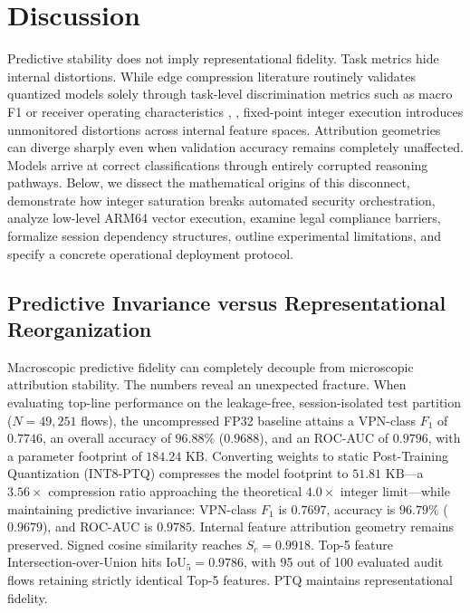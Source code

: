 \documentclass[conference]{IEEEtran}
\begin{document}
\section{Discussion}
Predictive stability does not imply representational fidelity. Task metrics hide internal distortions. While edge compression literature routinely validates quantized models solely through task-level discrimination metrics such as macro F1 or receiver operating characteristics \cite{b6}, \cite{b18}, fixed-point integer execution introduces unmonitored distortions across internal feature spaces. Attribution geometries can diverge sharply even when validation accuracy remains completely unaffected. Models arrive at correct classifications through entirely corrupted reasoning pathways. Below, we dissect the mathematical origins of this disconnect, demonstrate how integer saturation breaks automated security orchestration, analyze low-level ARM64 vector execution, examine legal compliance barriers, formalize session dependency structures, outline experimental limitations, and specify a concrete operational deployment protocol.

\subsection{Predictive Invariance versus Representational Reorganization}
Macroscopic predictive fidelity can completely decouple from microscopic attribution stability. The numbers reveal an unexpected fracture. When evaluating top-line performance on the leakage-free, session-isolated test partition ($N = 49,251$ flows), the uncompressed FP32 baseline attains a VPN-class $F_1$ of $0.7746$, an overall accuracy of $96.88\%$ ($0.9688$), and an ROC-AUC of $0.9796$, with a parameter footprint of $184.24\text{ KB}$. Converting weights to static Post-Training Quantization (INT8-PTQ) compresses the model footprint to $51.81\text{ KB}$—a $3.56\times$ compression ratio approaching the theoretical $4.0\times$ integer limit—while maintaining predictive invariance: VPN-class $F_1$ is $0.7697$, accuracy is $96.79\%$ ($0.9679$), and ROC-AUC is $0.9785$. Internal feature attribution geometry remains preserved. Signed cosine similarity reaches $S_c = 0.9918$. Top-5 feature Intersection-over-Union hits $\text{IoU}_5 = 0.9786$, with 95 out of 100 evaluated audit flows retaining strictly identical Top-5 features. PTQ maintains representational fidelity.
\end{document}

